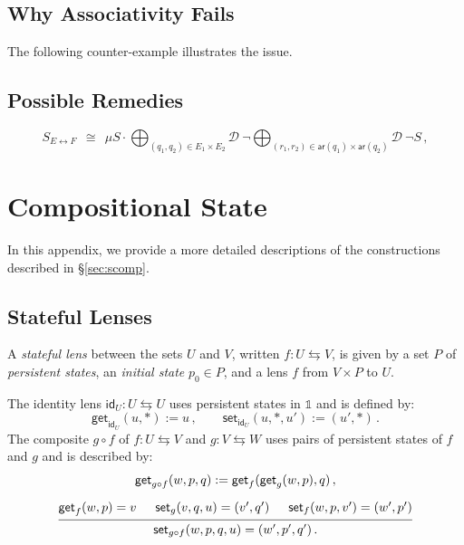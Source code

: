 \documentclass[acmsmall,nonacm]{acmart}
\newcommand{\kw}[1]{\ensuremath{ \mathsf{#1} }}
\newcommand{\mathbbm}[1]{\mathds{#1}}
\begin{document}

\subsection{Why Associativity Fails} %

The following counter-example illustrates
the issue.

\begin{example} \label{ex:vcomp-assoc-counter}
\end{example}


\subsection{Possible Remedies} %

\begin{equation} \label{eqn:refconfc}
  S_{E \leftrightarrow F} \:\:\cong\:\:
  \mu S \cdot
    \bigoplus_{(q_1, q_2) \in E_1 \times E_2}
    \mathcal{D}\:
    \lnot
    \bigoplus_{(r_1, r_2) \in \kw{ar}(q_1) \times \kw{ar}(q_2)}
    \mathcal{D}\:
    \lnot
    S
  \,,
\end{equation}



\section{Compositional State} %

In this appendix,
we provide a more detailed descriptions
of the constructions described in \S\ref{sec:scomp}.

\subsection{Stateful Lenses}

\begin{definition}
A \emph{stateful lens} between the sets $U$ and $V$,
written $f : U \leftrightarrows V$,
is given by a set $P$ of \emph{persistent states},
an \emph{initial state} $p_0 \in P$,
and a lens $f$ from $V \times P$ to $U$.

The identity lens $\kw{id}_U : U \leftrightarrows U$
uses persistent states in $\mathbbm{1}$ and is defined by:
\[
  \kw{get}_{\kw{id}_U}(u, *) := u
  \,,
  \qquad
  \kw{set}_{\kw{id}_U}(u, *, u') := (u', *)
  \,.
\]
The composite $g \circ f$ of
$f : U \leftrightarrows V$ and
$g : V \leftrightarrows W$
uses pairs of persistent states of $f$ and $g$ and
is described by:
\begin{gather*}
  \kw{get}_{g \circ f}(w, p, q) := \kw{get}_f(\kw{get}_g(w, p), q)
  \,,
  \\[1.5ex]
  \begin{prooftree}
    \hypo{\kw{get}_f(w, p) = v}
    \hypo{\kw{set}_g(v, q, u) = (v', q')}
    \hypo{\kw{set}_f(w, p, v') = (w', p')}
    \infer3{\kw{set}_{g \circ f}(w, p, q, u) = (w', p', q') \,.}
  \end{prooftree}
\end{gather*}
\end{definition}
\end{document}
